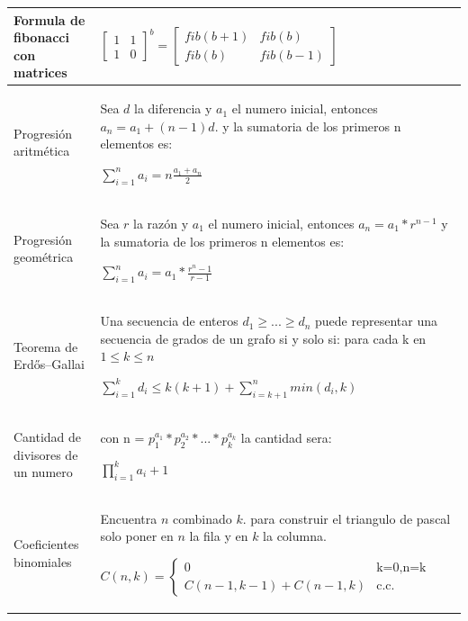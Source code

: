 \documentclass[10pt,landscape,twocolumn,a4paper,notitlepage]{article}
\begin{document}
\begin{center}
{\begin{supertabular}{|p{2.2cm}|p{8.2cm}|}
					Formula de fibonacci con matrices &
					
					{\large
					$\begin{bmatrix}
						1 & 1\\ 
						1 & 0
					\end{bmatrix}^{b} =
					\begin{bmatrix}
						fib(b+1) & fib(b) \\ 
						fib(b) & fib(b-1)
					\end{bmatrix}$}
					\\ \hline
					
					Progresión aritmética & Sea $d$ la diferencia y $a_{1}$ el numero inicial, entonces $a_{n} = 
					a_{1}+(n-1)d$. y la sumatoria de los primeros n elementos es:
					
					\vspace{1mm}
					{\Large$\sum_{i=1}^{n}a_{i} = n\frac{a_{1}+a_{n}}{2}$}
					\\ \hline
					
					Progresión geométrica & Sea $r$ la razón y $a_{1}$ el numero inicial, entonces $a_{n} = 
					a_{1}*r^{n-1}$ y la sumatoria de los primeros n elementos es:
					
					{\large
					$\sum_{i=1}^{n}a_{i} = a_{1} * \frac{r^{n}-1}{r-1}$}
					\\ \hline
					
					Teorema de Erd\H{o}s–Gallai & Una secuencia de enteros $d_{1} \geq ... \geq d_{n}$ puede 
					representar una secuencia de grados de un grafo si y solo si: para cada k en $1 \leq k \leq n$
					
					{\large
					$\sum_{i=1}^{k} d_{i} \leq k(k+1)+\sum_{i=k+1}^{n} min(d_{i},k)$}
					\\ \hline
					
					Cantidad de divisores de un numero & con n = $p_{1}^{a_{1}}*p_{2}^{a_{2}}*...*p_{k}^{a_{k}}$ 
					la cantidad sera:
					
					{\Large$\prod_{i=1}^{k} a_{i}+1$}
					\\ \hline
					
					Coeficientes binomiales & Encuentra $n$ combinado $k$. para construir el triangulo de pascal 
					solo poner en $n$ la fila y en $k$ la columna.
					
					$C(n, k) = 	
					\begin{cases}
						0 & \text{k=0,n=k}\\
						C(n-1,k-1)+C(n-1,k) & \text{c.c.}
					\end{cases}
					$
					\\ \hline
					

\end{supertabular}}
\end{center}
\end{document}

